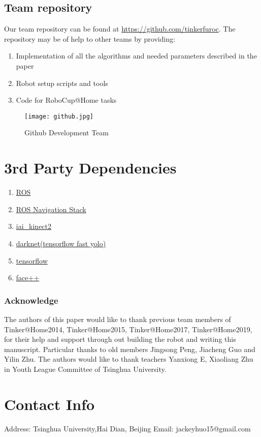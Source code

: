 \documentclass[runningheads,UTF8,fntef,a4paper]{llncs}
\begin{document}


\newpage

\subsection{Team repository}
Our team repository can be found at \url{https://github.com/tinkerfuroc}. The repository may be of help to other teams by providing:
\begin{enumerate}
    \item Implementation of all the algorithms and needed parameters described in the paper
    \item Robot setup scripts and tools
    \item Code for RoboCup@Home tasks 
\end{enumerate}

\begin{figure}[H]
	\centering
	\texttt{[image: github.jpg]}
	\caption{Github Development Team}
	\label{git}
\end{figure}

\section{3rd Party Dependencies}
\begin{enumerate}
    \item \href{www.ros.org}{ROS}
    \item \href{github.com/ros-planning/navigation}{ROS Navigation Stack}
    \item \href{github.com/code-iai/iai\_kinect2}{iai\_kinect2}
    \item \href{github.com/pjreddie/darknet}{darknet(tensorflow fast yolo)}
    \item \href{www.tensorflow.org}{tensorflow}
    \item \href{www.faceplusplus.com}{face++}
\end{enumerate}




\subsubsection{Acknowledge}
The authors of this paper would like to thank previous team members of Tinker@Home2014, Tinker@Home2015, Tinker@Home2017, Tinker@Home2019, for their help and support through out building the robot and writing this manuscript. Particular thanks to old members Jingsong Peng, Jiacheng Guo and Yilin Zhu. The authors would like to thank teachers Yanxiong E, Xiaoliang Zhu in Youth League Committee of Tsinghua University.

\section*{Contact Info}
Address: Tsinghua University,Hai Dian, Beijing
Email: jackeyhuo15@gmail.com

%

\end{document}
